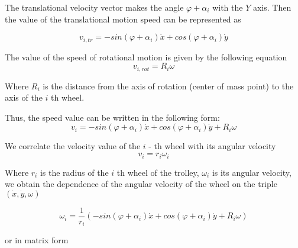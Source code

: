 \documentclass[oneside,final,14pt]{extreport}
\begin{document}
The translational velocity vector makes the angle $ \varphi + \alpha_{i} $ with the $ Y $ axis. Then the value of the translational motion speed can be represented as

\begin{equation}
v_{i, tr}
=
-sin (\varphi + \alpha_{i}) \dot{x}
+ cos (\varphi + \alpha_{i}) \dot{y}
\end{equation}



The value of the speed of rotational motion is given by the following equation
\begin{equation}
v_{i, rot}
=
R_{i} \omega
\end{equation}

Where $ R_{i} $ is the distance from the axis of rotation (center of mass point) to the axis of the $ i $ th wheel.
\iffalse
 Also fair
\begin{gather}
\dot{x}
=
v_{x} \boldsymbol{x}
\\
\dot{y}
=
v_{y} \boldsymbol{y}
\\
\dot{\varphi}
=
\omega \boldsymbol{z}
\end{gather}
Where $ v_{x} $, $ v_{x} $, $ \omega $ is the velocity value in the direction of $ \boldsymbol{x} $ and $ \boldsymbol{y} $, respectively, $ \omega $ is the angular velocity value.
\fi
Thus, the speed value can be written in the following form:
\begin{equation}
v_{i}
=
-sin (\varphi + \alpha_{i}) \dot{x}
+ cos (\varphi + \alpha_{i}) \dot{y}
+
R_{i} \omega
\end{equation}

We correlate the velocity value of the $ i $ - th wheel with its angular velocity
\begin{equation}
v_{i}
=
r_{i} \omega_{i}
\end{equation}

Where $ r_{i} $ is the radius of the $ i $ th wheel of the trolley, $ \omega_{i} $ is its angular velocity, we obtain the dependence of the angular velocity of the wheel on the triple $ (\dot{x}, \dot{y} , \omega) $

\begin{equation}
\omega_{i}
=
\frac{1}{r_{i}}
(
-sin (\varphi + \alpha_{i}) \dot{x}
+ cos (\varphi + \alpha_{i}) \dot{y}
+
R_{i} \omega
)
\end{equation}

or in matrix form
\end{document}
